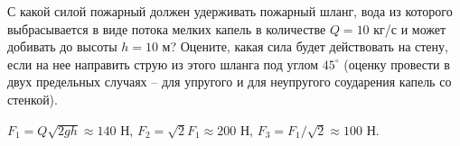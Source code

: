\begin{ex} %
С какой силой пожарный должен удерживать пожарный шланг, вода из которого выбрасывается в виде потока мелких капель в количестве $Q = 10$ кг/с и может добивать до высоты $h = 10$ м? Оцените, какая сила будет действовать на стену, если на нее направить струю из этого шланга под углом $45^{\circ}$ (оценку провести в двух предельных случаях -- для упругого и для неупругого соударения капель со стенкой).
\begin{ans}
$F_1 = Q\sqrt{2gh} \approx 140$ Н, $F_2 = \sqrt{2} F_1 \approx 200$ Н, $F_3 = F_1/\sqrt{2} \approx 100$ Н. 
\end{ans}
\end{ex}

\clearpage